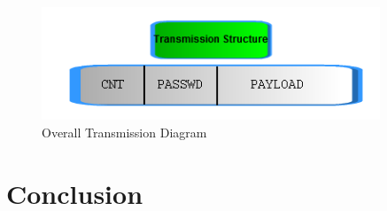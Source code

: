 \documentclass[titlepage]{article}
\begin{document}
\begin{figure}[htb]                                                                       
  \begin{center}
    \includegraphics[width=0.9\textwidth]{imgs/transmission.png}
  \end{center}
  \caption{Overall Transmission Diagram}
  \label{fig:transmission}
\end{figure}

\clearpage

\section{Conclusion}
\end{document}
